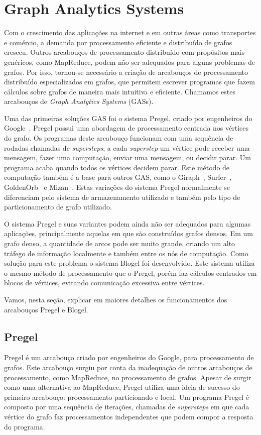 \documentclass[conference]{IEEEtran}
\begin{document}
\section{Graph Analytics Systems}
Com o crescimento das aplicações na internet e em outras áreas como 
transportes e comércio, a demanda por processamento eficiente e 
distribuído de grafos cresceu. Outros arcabouços de processamento 
distribuído com propósitos mais genéricos, como MapReduce, podem não ser
adequados para alguns problemas de grafos. Por isso, tornou-se
necessário a criação de arcabouços de processamento distribuído
especializados em grafos, que permitem escrever programas que fazem
cálculos sobre grafos de maneira mais intuitiva e eficiente. Chamamos
estes arcabouços de {\em Graph Analytics Systems} (GASs).

Uma das primeiras soluções GAS foi o sistema Pregel, criado por 
engenheiros do Google~\cite{pregel}. Pregel possui uma abordagem de 
processamento centrada nos vértices do grafo. Os programas deste 
arcabouço funcionam com uma sequência de rodadas chamadas de {\em
supersteps}; a cada {\em superstep} um vértice pode receber uma
mensagem, fazer uma computação, enviar uma mensagem, ou decidir parar.
Um programa acaba quando todos os vértices decidem parar. Este método de
computação também é a base para outros GAS, como o Giraph~\cite{giraph},
Surfer~\cite{surfer}, GoldenOrb~\cite{goldenorb} e Mizan~\cite{mizan}.
Estas variações do sistema Pregel normalmente se diferenciam pelo
sistema de armazenamento utilizado e também pelo tipo de particionamento
de grafo utilizado.

O sistema Pregel e suas variantes podem ainda não ser adequados para 
algumas aplicações, principalmente aquelas em que são construídos grafos
densos. Em um grafo denso, a quantidade de arcos pode ser muito grande, 
criando um alto tráfego de informação localmente e também entre os nós
de computação. Como solução para este problema o sistema Blogel foi 
desenvolvido. Este sistema utiliza o mesmo método de processamento que o
Pregel, porém faz cálculos centrados em blocos de vértices, evitando
comunicação excessiva entre vértices.

Vamos, nesta seção, explicar em maiores detalhes os funcionamentos dos
arcabouços Pregel e Blogel.

\subsection{Pregel}
Pregel é um arcabouço criado por engenheiros do Google, para
processamento de grafos. Este arcabouço surgiu por conta da inadequação 
de outros arcabouços de processamento, como MapReduce, no processamento
de grafos. Apesar de surgir como uma alternativa ao MapReduce, Pregel 
utiliza uma ideia de sucesso do primeiro arcabouço: processamento
particionado e local. Um programa Pregel é composto por uma sequência
de iterações, chamadas de {\em supersteps} em que cada vértice do grafo
faz processamentos independentes que podem compor a resposta do 
programa.
\end{document}

